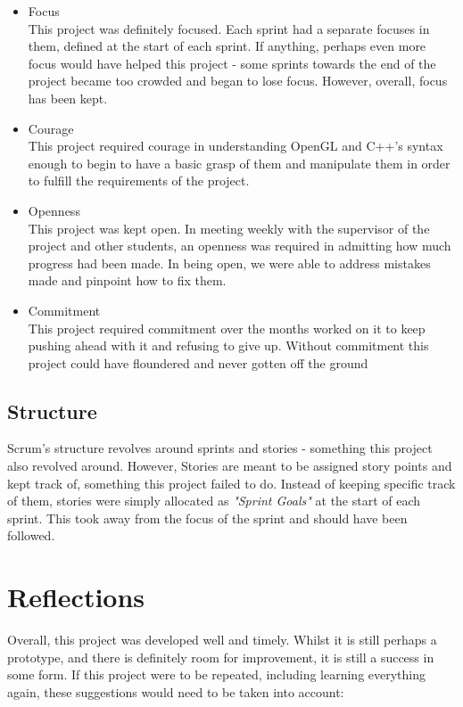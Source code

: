 \documentclass[a4paper,10pt]{report}
\begin{document}
\begin{itemize}
    \item Focus\\
    This project was definitely focused. Each sprint had a separate focuses in them, defined at the start of each sprint. If anything, perhaps even more focus would have helped this project - some sprints towards the end of the project became too crowded and began to lose focus. However, overall, focus has been kept.
    \item Courage\\
    This project required courage in understanding OpenGL and C++'s syntax enough to begin to have a basic grasp of them and manipulate them in order to fulfill the requirements of the project. 
    \item Openness\\
    This project was kept open. In meeting weekly with the supervisor of the project and other students, an openness was required in admitting how much progress had been made. In being open, we were able to address mistakes made and pinpoint how to fix them. 
    \item Commitment\\
    This project required commitment over the months worked on it to keep pushing ahead with it and refusing to give up. Without commitment this project could have floundered and never gotten off the ground
\end{itemize}

\subsection{Structure}
Scrum's structure revolves around sprints and stories - something this project also revolved around. However, Stories are meant to be assigned story points and kept track of, something this project failed to do. Instead of keeping specific track of them, stories were simply allocated as \textit{"Sprint Goals"} at the start of each sprint. This took away from the focus of the sprint and should have been followed.

\section{Reflections}
Overall, this project was developed well and timely. Whilst it is still perhaps a prototype, and there is definitely room for improvement, it is still a success in some form. If this project were to be repeated, including learning everything again, these suggestions would need to be taken into account:
\end{document}
